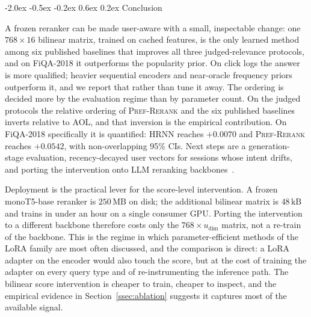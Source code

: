 \documentclass{article}
\makeatletter
\renewcommand{\section}{\@startsection {section}{1}{\z@}
  {-2.0ex \@plus -0.5ex \@minus -0.2ex}
  {0.6ex \@plus 0.2ex}
  {\normalfont\large\bfseries\centering}}
\makeatother
\begin{document}
\section{Conclusion}
\label{sec:conclusion}

A frozen reranker can be made user-aware with a small, inspectable
change: one $768\times16$ bilinear matrix, trained on cached features,
is the only learned method among six published baselines that
improves all three judged-relevance protocols, and on FiQA-2018
it outperforms the popularity prior. On click logs the answer is
more qualified; heavier sequential encoders and near-oracle
frequency priors outperform it, and we report that rather than tune
it away. The ordering is decided more by the evaluation regime
than by parameter count. On the judged protocols the relative
ordering of \textsc{Pref-Rerank} and the six published baselines
inverts relative to AOL, and that inversion is the empirical
contribution. On FiQA-2018 specifically it is quantified: HRNN
reaches $+0.0070$ and \textsc{Pref-Rerank} reaches $+0.0542$, with
non-overlapping 95\% CIs. Next steps are a generation-stage
evaluation, recency-decayed user vectors for sessions whose intent
drifts, and porting the intervention onto LLM reranking
backbones~\cite{lewis2020rag,zamani2020personalized}.

Deployment is the practical lever for the score-level intervention.
A frozen monoT5-base reranker is $250\,\mathrm{MB}$ on disk; the
additional bilinear matrix is $48\,\mathrm{kB}$ and trains in
under an hour on a single consumer GPU. Porting the intervention
to a different backbone therefore costs only the
$768{\times}u_{\dim}$ matrix, not a re-train of the backbone.
This is the regime in which parameter-efficient methods of the
LoRA family
\cite{lewis2020rag,zamani2020personalized,lin2025personalized}
are most often discussed, and the comparison is direct: a LoRA
adapter on the encoder would also touch the score, but at the
cost of training the adapter on every query type and of
re-instrumenting the inference path. The bilinear score
intervention is cheaper to train, cheaper to inspect, and the
empirical evidence in Section~\ref{ssec:ablation} suggests
it captures most of the available signal.


\newpage
\setlength{\itemsep}{0pt}
\setlength{\parsep}{0pt}


\end{document}

